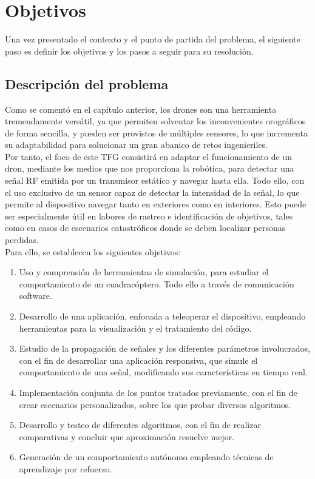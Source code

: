 \chapter{Objetivos}
\label{cap:capitulo2}

Una vez presentado el contexto y el punto de partida del problema, el siguiente paso es definir los objetivos y los pasos a seguir para su resolución.\\

\section{Descripción del problema}
\label{sec:descripcion_problema}

Como se comentó en el capítulo anterior, los drones son una herramienta tremendamente versátil, ya que permiten solventar los inconvenientes orográficos de forma sencilla, y pueden ser provistos de múltiples sensores, lo que incrementa su adaptabilidad para solucionar un gran abanico de retos ingenieriles.\\

Por tanto, el foco de este \ac{TFG} consistirá en adaptar el funcionamiento de un dron, mediante los medios que nos proporciona la robótica, para detectar una señal \ac{RF} emitida por un transmisor estático y navegar hasta ella. Todo ello, con el uso exclusivo de un sensor capaz de detectar la intensidad de la señal, lo que permite al dispositivo navegar tanto en exteriores como en interiores. Esto puede ser especialmente útil en labores de rastreo e identificación de objetivos, tales como en casos de escenarios catastróficos donde se deben localizar personas perdidas.\\

Para ello, se establecen los siguientes objetivos:

\begin{enumerate}
	\item Uso y comprensión de herramientas de simulación, para estudiar el comportamiento de un cuadracóptero. Todo ello a través de comunicación software.
	\item Desarrollo de una aplicación, enfocada a teleoperar el dispositivo, empleando herramientas para la visualización y el tratamiento del código.
	\item Estudio de la propagación de señales y los diferentes parámetros involucrados, con el fin de desarrollar una aplicación responsiva, que simule el comportamiento de una señal, modificando sus características en tiempo real.
	\item Implementación conjunta de los puntos tratados previamente, con el fin de crear escenarios personalizados, sobre los que probar diversos algoritmos.
	\item Desarrollo y testeo de diferentes algoritmos, con el fin de realizar comparativas y concluir que aproximación resuelve mejor.
	\item Generación de un comportamiento autónomo empleando técnicas de aprendizaje por refuerzo.
\end{enumerate}


